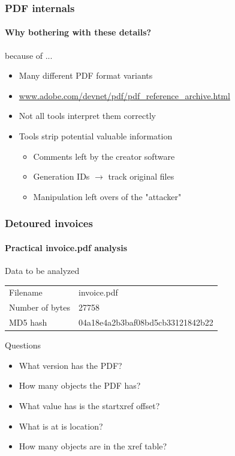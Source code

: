 \begin{frame}
    \frametitle{PDF internals}
    \framesubtitle{Why bothering with these details?}
    because of ...
    \begin{itemize}
        \item Many different PDF format variants
        \item \url{www.adobe.com/devnet/pdf/pdf_reference_archive.html}
        \item Not all tools interpret them correctly
        \item Tools strip potential valuable information
        \begin{itemize}
            \item Comments left by the creator software
            \item Generation IDs $\to$ track original files
            \item Manipulation left overs of the "attacker"
        \end{itemize}
    \end{itemize}
\end{frame}

\begin{frame}
    \frametitle{Detoured invoices}
    \framesubtitle{Practical invoice.pdf analysis}
    \begin{block}{Data to be analyzed}
        \begin{tabular}{ll}
            Filename &   invoice.pdf\\
            Number of bytes & 27758\\
            MD5 hash &  04a18e4a2b3baf08bd5cb33121842b22
        \end{tabular}
    \end{block}
    \begin{block}{Questions}
        \begin{itemize}
            \item What version has the PDF?
            \item How many objects the PDF has?
            \item What value has is the startxref offset?
            \item What is at is location?
            \item How many objects are in the xref table?
        \end{itemize}
    \end{block}
\end{frame}


